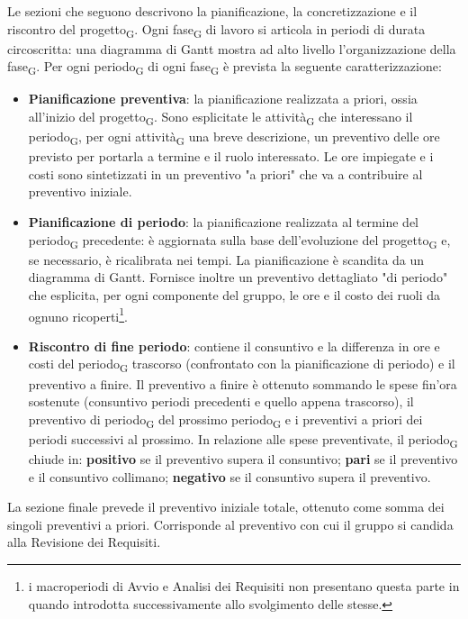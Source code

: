 Le sezioni che seguono descrivono la pianificazione, la concretizzazione e il riscontro del progetto\textsubscript{G}. Ogni fase\textsubscript{G} di lavoro si articola in periodi di durata circoscritta: una diagramma di Gantt mostra ad alto livello l'organizzazione della fase\textsubscript{G}. Per ogni periodo\textsubscript{G} di ogni fase\textsubscript{G} è prevista la seguente caratterizzazione:
\begin{itemize}
	\item \textbf{Pianificazione preventiva}: la pianificazione realizzata a priori, ossia all'inizio del progetto\textsubscript{G}. Sono esplicitate le attività\textsubscript{G} che interessano il periodo\textsubscript{G}, per ogni attività\textsubscript{G} una breve descrizione, un preventivo delle ore previsto per portarla a termine e il ruolo interessato. Le ore impiegate e i costi sono sintetizzati in un preventivo "a priori" che va a contribuire al preventivo iniziale.
	
	\item \textbf{Pianificazione di periodo}: la pianificazione realizzata al termine del periodo\textsubscript{G} precedente: è aggiornata sulla base dell'evoluzione del progetto\textsubscript{G} e, se necessario, è ricalibrata nei tempi. La pianificazione è scandita da un diagramma di Gantt. Fornisce inoltre un preventivo dettagliato "di periodo" che esplicita, per ogni componente del gruppo, le ore e il costo dei ruoli da ognuno ricoperti\footnote{i macroperiodi di Avvio e Analisi dei Requisiti non presentano questa parte in quando introdotta successivamente allo svolgimento delle stesse.}.
	
	\item \textbf{Riscontro di fine periodo}: contiene il consuntivo e la differenza in ore e costi del periodo\textsubscript{G} trascorso (confrontato con la pianificazione di periodo) e il preventivo a finire. Il preventivo a finire è ottenuto sommando le spese fin'ora sostenute (consuntivo periodi precedenti e quello appena trascorso), il preventivo di periodo\textsubscript{G} del prossimo periodo\textsubscript{G} e i preventivi a priori dei periodi successivi al prossimo. In relazione alle spese preventivate, il periodo\textsubscript{G} chiude in: \textbf{positivo} se il preventivo supera il consuntivo; \textbf{pari} se il preventivo e il consuntivo collimano; \textbf{negativo} se il consuntivo supera il preventivo.
	
\end{itemize}

La sezione finale prevede il preventivo iniziale totale, ottenuto come somma dei singoli preventivi a priori. Corrisponde al preventivo con cui il gruppo si candida alla Revisione dei Requisiti.
